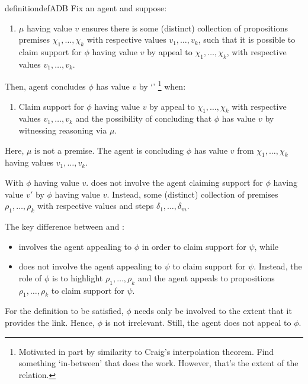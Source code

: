 \begin{note}

    \begin{restatable}[\adB{}]{definition}{defADB}\label{AR:adB}\label{def:adB}
    Fix an agent and suppose:
    \begin{enumerate}[label=\textsf{I:\arabic*}., ref=(\textsf{I}:\arabic*), series=adB_counter]
    \item
      \label{def:adB:poss}
      \(\mu\) having value \(v\) ensures there is some (distinct) collection of propositions premises \(\chi_{1},\dots,\chi_{k}\) with respective values \(v_{1},\dots,v_{k}\), such that it is possible to claim support for \(\phi\) having value \(v\) by appeal to \(\chi_{1},\dots,\chi_{k}\), with respective values \(v_{1},\dots,v_{k}\).
    \end{enumerate}
    Then, agent concludes \(\phi\) has value \(v\) by `\adB{}'\nolinebreak
    \footnote{
      Motivated in part by similarity to Craig's interpolation theorem.
      Find something `in-between' that does the work.
      However, that's the extent of the relation.
    }
    when:
    \begin{enumerate}[label=\textsf{I}:\arabic*., ref=(\textsf{I}:\arabic*), resume*=adB_counter]
    \item
      \label{def:adB:inter}
      Claim support for \(\phi\) having value \(v\) by appeal to \(\chi_{1},\dots,\chi_{k}\) with respective values \(v_{1},\dots,v_{k}\) and the possibility of concluding that \(\phi\) has value \(v\) by witnessing reasoning via \(\mu\).
    \end{enumerate}
    Here, \(\mu\) is not a premise.
    The agent is concluding \(\phi\) has value \(v\) from \(\chi_{1},\dots,\chi_{k}\) having values \(v_{1},\dots,v_{k}\).
    \vspace{-\baselineskip}
  \end{restatable}
\end{note}

\begin{note}
  With \adA{} \(\phi\) having value \(v\).
  \adB{} does not involve the agent claiming support for \(\phi\) having value \(v'\) by \(\phi\) having value \(v\).
  Instead, some (distinct) collection of premises \(\rho_{1},\dots,\rho_{k}\) with respective values and steps \(\delta_{1},\dots,\delta_{m}\).

  The key difference between \adA{} and \adB{}:
  \begin{itemize}
  \item \adA{} involves the agent appealing to \(\phi\) in order to claim support for \(\psi\), while
  \item \adB{} does not involve the agent appealing to \(\psi\) to claim support for \(\psi\).
    Instead, the role of \(\phi\) is to highlight \(\rho_{1},\dots,\rho_{k}\) and the agent appeals to propositions \(\rho_{1},\dots,\rho_{k}\) to claim support for \(\psi\).
  \end{itemize}

  For the definition to be satisfied, \(\phi\) needs only be involved to the extent that it provides the link.
  Hence, \(\phi\) is not irrelevant.
  Still, the agent does not appeal to \(\phi\).
\end{note}

